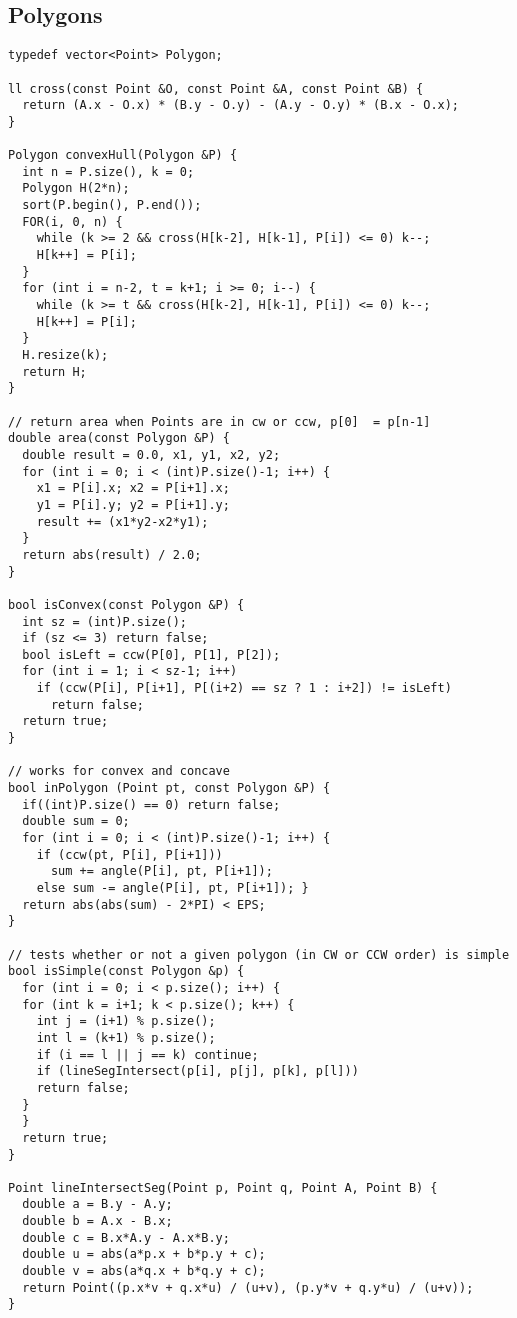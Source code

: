 \documentclass[11pt, oneside]{article}
\begin{document}
\subsection{Polygons}
\begin{lstlisting}
typedef vector<Point> Polygon;

ll cross(const Point &O, const Point &A, const Point &B) {
  return (A.x - O.x) * (B.y - O.y) - (A.y - O.y) * (B.x - O.x);
}

Polygon convexHull(Polygon &P) {
  int n = P.size(), k = 0;
  Polygon H(2*n);
  sort(P.begin(), P.end());
  FOR(i, 0, n) {
    while (k >= 2 && cross(H[k-2], H[k-1], P[i]) <= 0) k--;
    H[k++] = P[i];
  }
  for (int i = n-2, t = k+1; i >= 0; i--) {
    while (k >= t && cross(H[k-2], H[k-1], P[i]) <= 0) k--;
    H[k++] = P[i];
  }
  H.resize(k);
  return H;
}

// return area when Points are in cw or ccw, p[0]  = p[n-1]
double area(const Polygon &P) {
  double result = 0.0, x1, y1, x2, y2;
  for (int i = 0; i < (int)P.size()-1; i++) {
    x1 = P[i].x; x2 = P[i+1].x;
    y1 = P[i].y; y2 = P[i+1].y;
    result += (x1*y2-x2*y1);
  }
  return abs(result) / 2.0;
}

bool isConvex(const Polygon &P) {
  int sz = (int)P.size();
  if (sz <= 3) return false;
  bool isLeft = ccw(P[0], P[1], P[2]);
  for (int i = 1; i < sz-1; i++)
    if (ccw(P[i], P[i+1], P[(i+2) == sz ? 1 : i+2]) != isLeft)
      return false;
  return true;
}

// works for convex and concave
bool inPolygon (Point pt, const Polygon &P) {
  if((int)P.size() == 0) return false;
  double sum = 0;
  for (int i = 0; i < (int)P.size()-1; i++) {
    if (ccw(pt, P[i], P[i+1]))
      sum += angle(P[i], pt, P[i+1]);
    else sum -= angle(P[i], pt, P[i+1]); }
  return abs(abs(sum) - 2*PI) < EPS;
}

// tests whether or not a given polygon (in CW or CCW order) is simple
bool isSimple(const Polygon &p) {
  for (int i = 0; i < p.size(); i++) {
  for (int k = i+1; k < p.size(); k++) {
    int j = (i+1) % p.size();
    int l = (k+1) % p.size();
    if (i == l || j == k) continue;
    if (lineSegIntersect(p[i], p[j], p[k], p[l]))
    return false;
  }
  }
  return true;
}

Point lineIntersectSeg(Point p, Point q, Point A, Point B) {
  double a = B.y - A.y;
  double b = A.x - B.x;
  double c = B.x*A.y - A.x*B.y;
  double u = abs(a*p.x + b*p.y + c);
  double v = abs(a*q.x + b*q.y + c);
  return Point((p.x*v + q.x*u) / (u+v), (p.y*v + q.y*u) / (u+v));
}


\end{lstlisting}
\end{document}
